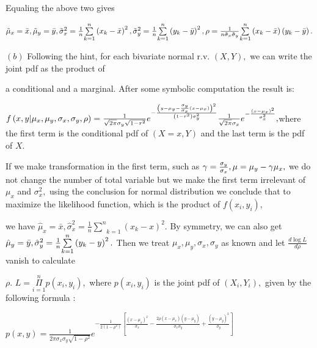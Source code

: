 \documentclass{article}
\begin{document}
Equaling the above two gives

$\tilde{\mu}_{x}=\bar{x},\tilde{\mu}_{y}=\bar{y},\tilde{\sigma}_{x}^{2}=%
\frac{1}{n}\underset{k=1}{\overset{n}{\sum }}\left( x_{k}-\bar{x}\right)
^{2},\tilde{\sigma}_{y}^{2}=\frac{1}{n}\underset{k=1}{\overset{n}{\sum }}%
\left( y_{k}-\bar{y}\right) ^{2},\rho =\frac{1}{n\tilde{\sigma}_{x}\tilde{%
\sigma}_{y}}\underset{k=1}{\overset{n}{\sum }}\left( x_{k}-\bar{x}\right)
\left( y_{k}-\bar{y}\right) .$

$\left( b\right) $ Following the hint, for each bivariate normal r.v. $%
\left( X,Y\right) ,$ we can write the joint pdf as the product of

a conditional and a marginal. After some symbolic computation the result is:

$f\left( x,y|\mu _{x},\mu _{y},\sigma _{x},\sigma _{y},\rho \right) =\frac{1%
}{\sqrt{2\pi }\sigma _{y}\sqrt{1-r^{2}}}e^{-\frac{\left( y-\mu _{y}-\frac{%
\sigma _{y}}{\sigma _{x}}\left( x-\mu _{x}\right) \right) ^{2}}{\left(
1-r^{2}\right) \sigma _{y}^{2}}}\frac{1}{\sqrt{2\pi }\sigma _{x}}e^{-\frac{%
\left( x-\mu _{x}\right) ^{2}}{\sigma _{x}^{2}}},$where the first term is
the conditional pdf of $\left( X=x,Y\right) $ and the last term is the pdf
of $X.$

\bigskip If we make transformation in the first term, such as $\gamma =\frac{%
\sigma _{y}}{\sigma _{x}},\mu =\mu _{y}-\gamma \mu _{x},$ we do not change
the number of total variable but we make the first term irrelevant of $\mu
_{x}$ and $\sigma _{x}^{2},$ using the conclusion for normal distribution we
conclude that to maximize the likelihood function, which is the product of $%
f\left( x_{i},y_{i}\right) ,$

we have $\hat{\mu}_{x}=\bar{x},\hat{\sigma}_{x}^{2}=\frac{1}{n}\underset{k=1}%
{\overset{n}{\sum }}\left( x_{k}-x\right) ^{2}.$ By symmetry, we can also
get $\hat{\mu}_{y}=\bar{y},\hat{\sigma}_{y}^{2}=\frac{1}{n}\underset{k=1}{%
\overset{n}{\sum }}\left( y_{k}-y\right) ^{2}.$ Then we treat $\mu _{x},\mu
_{y},\sigma _{x},\sigma _{y}$ as known and let $\frac{d\log L}{d\rho }$
vanish to calculate

$\rho .$ $L=\underset{i=1}{\overset{n}{\Pi }}p\left( x_{i},y_{i}\right) ,$%
where $p\left( x_{i},y_{i}\right) $ is the joint pdf of $\left(
X_{i},Y_{i}\right) ,$ given by the following formula :

$p\left( x,y\right) =\frac{1}{2\pi \sigma _{x}\sigma _{y}\sqrt{1-\rho ^{2}}}%
e^{-\frac{1}{2\left( 1-\rho ^{2}\right) }\left[ \frac{\left( x-\mu
_{x}\right) ^{2}}{\sigma _{x}}-\frac{2\rho \left( x-\mu _{x}\right) \left(
y-\mu _{y}\right) }{\sigma _{x}\sigma _{y}}+\frac{\left( y-\mu _{y}\right)
^{2}}{\sigma _{y}}\right] }$
\end{document}
